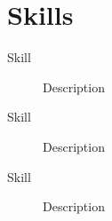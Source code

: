 \documentclass[11pt,letterpaper]{article}
\begin{document}
\lipsum[1][5-9]

\section{Skills} %

\begin{description}
  \item[Skill] Description
  \item[Skill] Description
  \item[Skill] Description
\end{description}
\end{document}
